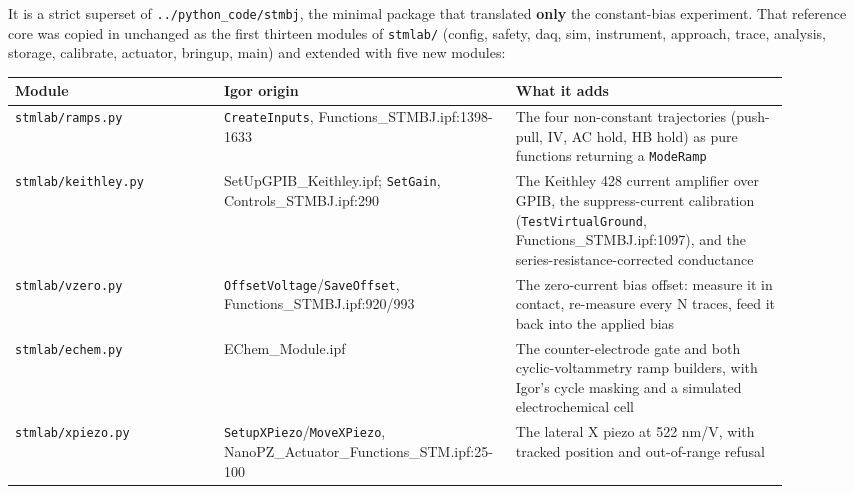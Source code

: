 It is a strict superset of \texttt{.\discretionary{}{}{}.\discretionary{}{}{}/\discretionary{}{}{}python\_\discretionary{}{}{}code/\discretionary{}{}{}stmbj}, the minimal package that translated \textbf{only} the constant-bias experiment. That reference core was copied in unchanged as the first thirteen modules of \texttt{stmlab/\discretionary{}{}{}} (config, safety, daq, sim, instrument, approach, trace, analysis, storage, calibrate, actuator, bringup, main) and extended with five new modules:

\small\setlength{\LTleft}{0pt}\setlength{\LTright}{\fill}
\begin{longtable}{@{}>{\raggedright\arraybackslash}p{0.26\linewidth}>{\raggedright\arraybackslash}p{0.30\linewidth}>{\raggedright\arraybackslash}p{0.34\linewidth}@{}}
\toprule
\textbf{Module} & \textbf{Igor origin} & \textbf{What it adds} \\
\midrule\endhead
\texttt{stmlab/\discretionary{}{}{}ramps.\discretionary{}{}{}py} & \texttt{Create\discretionary{}{}{}Inputs}, Functions\_STMBJ.ipf:1398-1633 & The four non-constant trajectories (push-pull, IV, AC hold, HB hold) as pure functions returning a \texttt{Mode\discretionary{}{}{}Ramp} \\
\texttt{stmlab/\discretionary{}{}{}keithley.\discretionary{}{}{}py} & SetUpGPIB\_Keithley.ipf; \texttt{Set\discretionary{}{}{}Gain}, Controls\_STMBJ.ipf:290 & The Keithley 428 current amplifier over GPIB, the suppress-current calibration (\texttt{Test\discretionary{}{}{}Virtual\discretionary{}{}{}Ground}, Functions\_STMBJ.ipf:1097), and the series-resistance-corrected conductance \\
\texttt{stmlab/\discretionary{}{}{}vzero.\discretionary{}{}{}py} & \texttt{Offset\discretionary{}{}{}Voltage}/\texttt{Save\discretionary{}{}{}Offset}, Functions\_STMBJ.ipf:920/993 & The zero-current bias offset: measure it in contact, re-measure every N traces, feed it back into the applied bias \\
\texttt{stmlab/\discretionary{}{}{}echem.\discretionary{}{}{}py} & EChem\_Module.ipf & The counter-electrode gate and both cyclic-voltammetry ramp builders, with Igor's cycle masking and a simulated electrochemical cell \\
\texttt{stmlab/\discretionary{}{}{}xpiezo.\discretionary{}{}{}py} & \texttt{Setup\discretionary{}{}{}XPiezo}/\texttt{Move\discretionary{}{}{}XPiezo}, NanoPZ\_Actuator\_Functions\_STM.ipf:25-100 & The lateral X piezo at 522 nm/V, with tracked position and out-of-range refusal \\
\bottomrule
\end{longtable}
\normalsize

